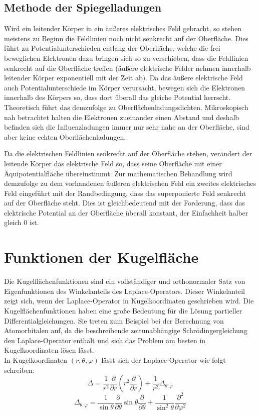 \documentclass[titlepage,11pt,a4paper,ngerman]{report}
\newcommand{\vphi}{\varphi}
\begin{document}
\renewcommand\appendixpagename{Anhang}
\begin{appendices}
\section{Methode der Spiegelladungen}\label{imagechargestheory}
Wird ein leitender Körper in ein äußeres elektrisches Feld gebracht, so stehen meistens zu Beginn die Feldlinien noch nicht senkrecht auf der Oberfläche. Dies führt zu Potentialunterschieden entlang der Oberfläche, welche die frei beweglichen Elektronen dazu bringen sich so zu verschieben, dass die Feldlinien senkrecht auf die Oberfläche treffen (äußere elektrische Felder nehmen innerhalb leitender Körper exponentiell mit der Zeit ab). Da das äußere elektrische Feld auch Potentialunterschiede im Körper verursacht, bewegen sich die Elektronen innerhalb des Körpers so, dass dort überall das gleiche Potential herrscht. Theoretisch führt das demzufolge zu Oberflächenladungsdichten. Mikroskopisch nah betrachtet halten die Elektronen zueinander einen Abstand und deshalb befinden sich die Influenzladungen immer nur sehr nahe an der Oberfläche, sind aber keine echten Oberflächenladungen.
\par
Da die elektrischen Feldlinien senkrecht auf der Oberfläche stehen, verändert der leitende Körper das elektrische Feld so, dass seine Oberfläche mit einer Äquipotentialfläche übereinstimmt. Zur mathematischen Behandlung wird demzufolge zu dem vorhandenen äußeren elektrischen Feld ein zweites elektrisches Feld eingeführt mit der Randbedingung, dass das superponierte Feld senkrecht auf der Oberfläche steht. Dies ist gleichbedeutend mit der Forderung, dass das elektrische Potential an der Oberfläche überall konstant, der Einfachheit halber gleich 0 ist.
\end{appendices}

\section{Funktionen der Kugelfläche}\label{sphericalfunctions}
Die Kugelflächenfunktionen sind ein vollständiger und orthonormaler Satz von Eigenfunktionen des Winkelanteils des Laplace-Operators. Dieser Winkelanteil zeigt sich, wenn der Laplace-Operator in Kugelkoordinaten geschrieben wird. Die Kugelflächenfunktionen haben eine große Bedeutung für die Lösung partieller Differentialgleichungen. Sie treten zum Beispiel bei der Berechnung von Atomorbitalen auf, da die beschreibende zeitunabhängige Schrödingergleichung den Laplace-Operator enthält und sich das Problem am besten in Kugelkoordinaten lösen lässt.\hfill\break
\\
In Kugelkoordinaten $(r,\theta,\varphi)$ lässt sich der Laplace-Operator wie folgt schreiben:
\[\Delta=\frac{1}{r^2}\frac{\partial}{\partial r}\left(r^2\frac{\partial}{\partial r}\right)+\frac{1}{r^2}\Delta_{\theta,\vphi}\]
\[\Delta_{\theta,\vphi}=\frac{1}{\sin\theta}\frac{\partial}{\partial\theta}\sin\theta\frac{\partial}{\partial\theta}+\frac{1}{\sin^2\theta}\frac{\partial^2}{\partial\vphi^2}\]
\noindent
\end{document}
